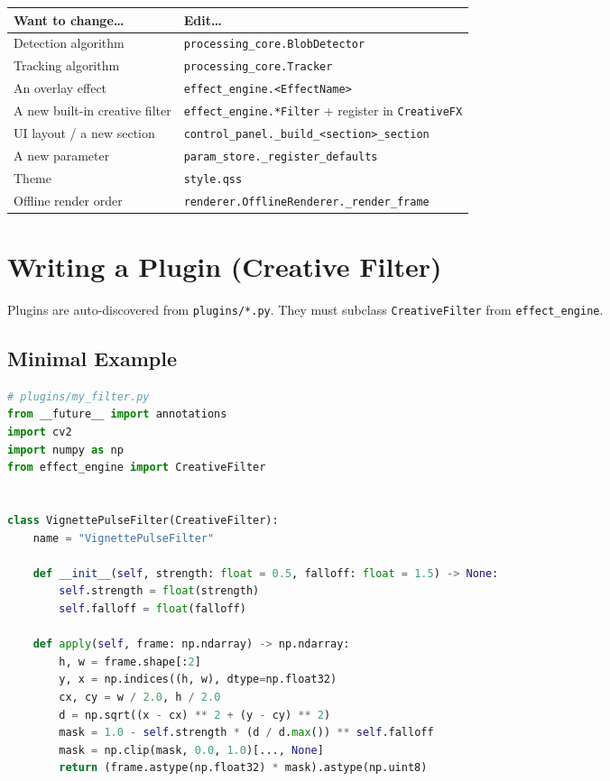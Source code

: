 \documentclass[11pt,a4paper,openany]{report}
\begin{document}
\begin{tabularx}{\linewidth}{@{}lX@{}}
    \toprule
    \textbf{Want to change\ldots} & \textbf{Edit\ldots} \\
    \midrule
    Detection algorithm           & \texttt{processing\_core.BlobDetector} \\
    Tracking algorithm            & \texttt{processing\_core.Tracker} \\
    An overlay effect             & \texttt{effect\_engine.<EffectName>} \\
    A new built-in creative filter & \texttt{effect\_engine.*Filter} + register in \texttt{CreativeFX} \\
    UI layout / a new section     & \texttt{control\_panel.\_build\_<section>\_section} \\
    A new parameter               & \texttt{param\_store.\_register\_defaults} \\
    Theme                         & \texttt{style.qss} \\
    Offline render order          & \texttt{renderer.OfflineRenderer.\_render\_frame} \\
    \bottomrule
\end{tabularx}

\section{Writing a Plugin (Creative Filter)}

Plugins are auto-discovered from \texttt{plugins/*.py}. They must subclass
\texttt{CreativeFilter} from \texttt{effect\_engine}.

\subsection{Minimal Example}

\begin{lstlisting}[language=Python]
# plugins/my_filter.py
from __future__ import annotations
import cv2
import numpy as np
from effect_engine import CreativeFilter


class VignettePulseFilter(CreativeFilter):
    name = "VignettePulseFilter"

    def __init__(self, strength: float = 0.5, falloff: float = 1.5) -> None:
        self.strength = float(strength)
        self.falloff = float(falloff)

    def apply(self, frame: np.ndarray) -> np.ndarray:
        h, w = frame.shape[:2]
        y, x = np.indices((h, w), dtype=np.float32)
        cx, cy = w / 2.0, h / 2.0
        d = np.sqrt((x - cx) ** 2 + (y - cy) ** 2)
        mask = 1.0 - self.strength * (d / d.max()) ** self.falloff
        mask = np.clip(mask, 0.0, 1.0)[..., None]
        return (frame.astype(np.float32) * mask).astype(np.uint8)
\end{lstlisting}
\end{document}

